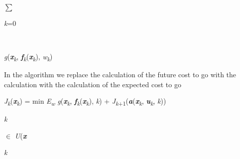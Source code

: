 \documentclass[12pt,twoside]{article}
\begin{document}
\begin{FlushLeft}
\\
{\fontsize{14pt}{16.8pt}\selectfont $ \sum $ \par}
\end{FlushLeft}\par

\begin{FlushLeft}
{\fontsize{7pt}{8.4pt}\selectfont \textit{k}=0\par}
\end{FlushLeft}\par

\begin{FlushLeft}
\\
{\fontsize{10pt}{12.0pt}\selectfont \textit{g}(\textbf{\textit{x}}\textit{\textsubscript{k}}, \textbf{\textit{f}}\textit{\textsubscript{k}}(\textbf{\textit{x}}\textit{\textsubscript{k}}), \textit{w\textsubscript{k}})\par}
\end{FlushLeft}\par


\vspace{\baselineskip}

\vspace{\baselineskip}
{\fontsize{10pt}{12.0pt}\selectfont In the algorithm we replace the calculation of the future cost to go with the calculation with the calculation of the expected cost to go\par}\par


\vspace{\baselineskip}
\begin{FlushLeft}
{\fontsize{10pt}{12.0pt}\selectfont \textit{J\textsubscript{k}}(\textbf{\textit{x}}\textit{\textsubscript{k}}) = \tabto{2.25in} min \textit{E\textsubscript{w} g}(\textbf{\textit{x}}\textit{\textsubscript{k}}, \textbf{\textit{f}}\textit{\textsubscript{k}}(\textbf{\textit{x}}\textit{\textsubscript{k}}), \textit{k}) + \textit{J\textsubscript{k}}\textsubscript{+1}(\textbf{\textit{a}}(\textbf{\textit{x}}\textit{\textsubscript{k}}, \textbf{\textit{u}}\textit{\textsubscript{k}}, \textit{k}))\par}
\end{FlushLeft}\par

\begin{FlushLeft}
{\fontsize{6pt}{7.2pt}\selectfont \textit{k }{\fontsize{7pt}{8.4pt}\selectfont $ \in $ \textit{U}(\textbf{\textit{x}}{\fontsize{6pt}{7.2pt}\selectfont \textit{k}\par}\par}\par}
\end{FlushLeft}\par
\end{document}
